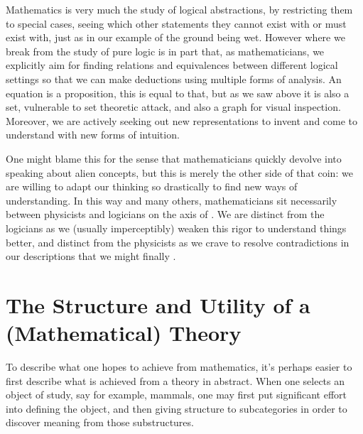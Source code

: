 \documentclass[11pt]{article}
\begin{document}
Mathematics is very much the study of logical abstractions, by restricting them to special cases, seeing which other statements they cannot exist with or must exist with, just as in our example of the ground being wet. However where we break from the study of pure logic is in part that, as mathematicians, we explicitly aim for finding relations and equivalences between different logical settings so that we can make deductions using multiple forms of analysis. An equation is a proposition, this is equal to that, but as we saw above it is also a set, vulnerable to set theoretic attack, and also a graph for visual inspection. Moreover, we are actively seeking out new representations to invent and come to understand with new forms of intuition.

One might blame this for the sense that mathematicians quickly devolve into speaking about alien concepts, but this is merely the other side of that coin: we are willing to adapt our thinking so drastically to find new ways of understanding. In this way and many others, mathematicians sit necessarily between physicists and logicians on the axis of . We are distinct from the logicians as we (usually imperceptibly) weaken this rigor to understand things better, and distinct from the physicists as we crave to resolve contradictions in our descriptions that we might finally .

\section{The Structure and Utility of a (Mathematical) Theory}

To describe what one hopes to achieve from mathematics, it's perhaps easier to first describe what is achieved from a theory in abstract. When one selects an object of study, say for example, mammals, one may first put significant effort into defining the object, and then giving structure to subcategories in order to discover meaning from those substructures.
\end{document}
